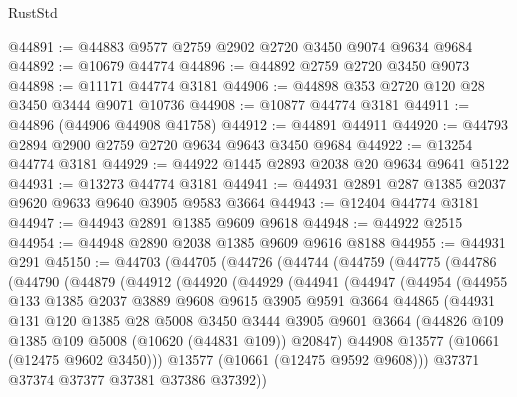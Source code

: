 \begin{lexlean}{RustStd}
\begin{coremodule}
@44891 := @44883 @9577 @2759 @2902 @2720 @3450 @9074 @9634 @9684
@44892 := @10679 @44774
@44896 := @44892 @2759 @2720 @3450 @9073
@44898 := @11171 @44774 @3181
@44906 := @44898 @353 @2720 @120 @28 @3450 @3444 @9071 @10736
@44908 := @10877 @44774 @3181
@44911 := @44896 (@44906 @44908 @41758)
@44912 := @44891 @44911
@44920 := @44793 @2894 @2900 @2759 @2720 @9634 @9643 @3450 @9684
@44922 := @13254 @44774 @3181
@44929 := @44922 @1445 @2893 @2038 @20 @9634 @9641 @5122
@44931 := @13273 @44774 @3181
@44941 := @44931 @2891 @287 @1385 @2037 @9620 @9633 @9640 @3905 @9583 @3664
@44943 := @12404 @44774 @3181
@44947 := @44943 @2891 @1385 @9609 @9618
@44948 := @44922 @2515
@44954 := @44948 @2890 @2038 @1385 @9609 @9616 @8188
@44955 := @44931 @291
@45150 := @44703
    (@44705
      (@44726
        (@44744
          (@44759
            (@44775
              (@44786
                (@44790
                  (@44879
                    (@44912
                      (@44920
                        (@44929
                          (@44941
                            (@44947
                              (@44954
                                (@44955
                                  @133
                                  @1385
                                  @2037
                                  @3889
                                  @9608
                                  @9615
                                  @3905
                                  @9591
                                  @3664
                                  @44865
                                  (@44931
                                    @131
                                    @120
                                    @1385
                                    @28
                                    @5008
                                    @3450
                                    @3444
                                    @3905
                                    @9601
                                    @3664
                                    (@44826 @109 @1385 @109 @5008 (@10620 (@44831 @109)) @20847)
                                    @44908
                                    @13577
                                    (@10661 (@12475 @9602 @3450)))
                                  @13577
                                  (@10661 (@12475 @9592 @9608)))
                                @37371
                                @37374
                                @37377
                                @37381
                                @37386
                                @37392))

\end{coremodule}
\end{lexlean}
